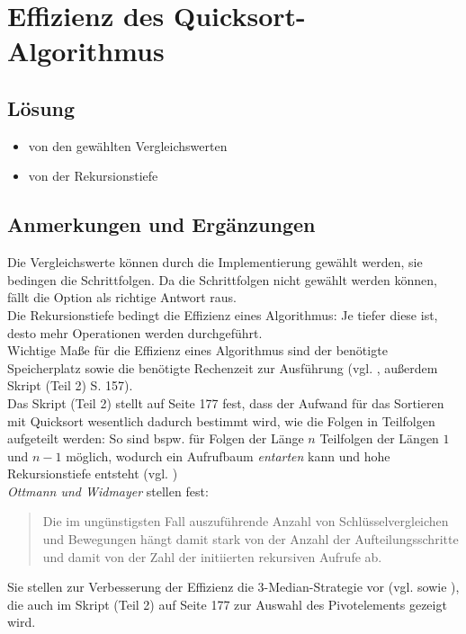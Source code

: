 \chapter{Effizienz des Quicksort-Algorithmus}

\section*{Lösung}

\begin{itemize}
    \item von den gewählten Vergleichswerten
    \item von der Rekursionstiefe
\end{itemize}


\section*{Anmerkungen und Ergänzungen}

Die Vergleichswerte können durch die Implementierung gewählt werden, sie bedingen die Schrittfolgen.
Da die Schrittfolgen nicht gewählt werden können, fällt die Option als richtige Antwort raus.\\
Die Rekursionstiefe bedingt die Effizienz eines Algorithmus: Je tiefer diese ist, desto mehr Operationen werden durchgeführt.\\

Wichtige Maße für die Effizienz eines Algorithmus sind der benötigte Speicherplatz sowie die benötigte Rechenzeit zur Ausführung (vgl. \cite[2]{OW17a}, außerdem Skript (Teil 2) S. 157).
\\
Das Skript (Teil 2) stellt auf Seite 177 fest, dass der Aufwand für das Sortieren mit Quicksort wesentlich dadurch bestimmt wird, wie die Folgen in Teilfolgen aufgeteilt werden: So sind bspw. für Folgen der Länge $n$ Teilfolgen der Längen $1$ und $n-1$ möglich, wodurch ein Aufrufbaum \textit{entarten} kann und hohe Rekursionstiefe entsteht (vgl. \cite[177 f.]{GD18e})
\\

\textit{Ottmann und Widmayer} stellen fest:

\blockquote[{\cite[96]{OW17b}}]{
    Die im ungünstigsten Fall auszuführende Anzahl von Schlüsselvergleichen und Bewegungen
    hängt damit stark von der Anzahl der Aufteilungsschritte und damit von der Zahl der
    initiierten rekursiven Aufrufe ab.
}

Sie stellen zur Verbesserung der Effizienz die 3-Median-Strategie vor (vgl. \cite[102]{OW17b} sowie \cite[183]{GD18e}), die auch im Skript (Teil 2) auf Seite 177 zur Auswahl des Pivotelements gezeigt wird.
